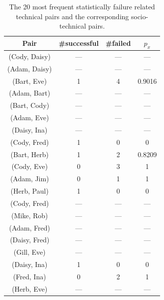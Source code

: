 \begin{table}[t]
\centering
\begin{tabular}{@{\hspace{.2cm}}ccc@{\hspace{.75cm}}c@{\hspace{.2cm}}}
\toprule
Pair & \#successful & \#failed & $p_x$ \\
\midrule
(Cody, Daisy)	&	---&	---&	---\\
(Adam, Daisy)	&	---&	---&	---\\
(Bart, Eve)	&	1&	4&	0.9016\\
(Adam, Bart)	&	---&	---&	---\\
(Bart, Cody)	&	---&	---&	---\\
(Adam, Eve)	&	---&	---&	---\\
(Daisy, Ina)	&	---&	---&	---\\
(Cody, Fred)	&	1&	0&	0\\
(Bart, Herb)	&	1&	2&	0.8209\\
(Cody, Eve)	&	0&	3&	1\\
(Adam, Jim)	&	0&	1&	1\\
(Herb, Paul)	&	1&	0&	0\\
(Cody, Fred)	&	---&	---&	---\\
(Mike, Rob)	&	---&	---&	---\\
(Adam, Fred)	&	---&	---&	---\\
(Daisy, Fred)	&	---&	---&	---\\
(Gill, Eve)		&	---&	---&	---\\
(Daisy, Ina)	&	1&	0&	0\\
(Fred, Ina)	&	0&	2&	1\\
(Herb, Eve)	&	---&	---&	---\\
\bottomrule
\end{tabular}
\label{tab:stechpairs}
\caption{The 20 most frequent statistically failure related technical pairs and the corresponding socio-technical pairs.}
\end{table}





